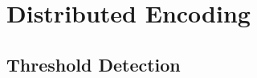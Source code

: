 \documentclass[mathserif]{beamer}
\newcommand{\sgn}{\mathsf{sign}}
\newcommand{\unif}{\mathsf{unif}}
\newcommand{\Prob}{\mathbb{P}}
\begin{document}


\section{Distributed Encoding}

\subsection{Threshold Detection}
\end{document}
